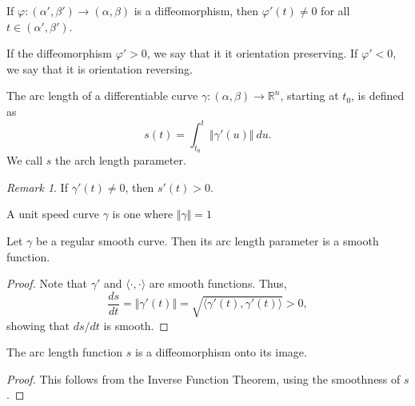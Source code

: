 \documentclass[11pt]{article}
\newcommand{\R}{\mathbb{R}}
\newcommand{\ip}[2]{\langle #1, #2 \rangle}
\newcommand{\norm}[1]{\Vert #1 \Vert}
\newcommand{\dd}[2]{\frac{d #1}{d #2}}
\theoremstyle{definition}
\theoremstyle{remark}
\newtheorem*{remark}{Remark}
\numberwithin{equation}{section}
\begin{document}
    \begin{lemma}
        If $\varphi\colon (\alpha', \beta') \to (\alpha, \beta)$ is a diffeomorphism,
        then $\varphi'(t) \neq 0$ for all $t \in (\alpha', \beta')$.
    \end{lemma}

    \begin{definition}
        If the diffeomorphism $\varphi' > 0$, we say that it it orientation
        preserving. If $\varphi' < 0$, we say that it is orientation reversing.
    \end{definition}

    \begin{definition}
        The arc length of a differentiable curve $\gamma\colon (\alpha, \beta) \to
        \R^n$, starting at $t_0$, is defined as \[
            s(t) = \int_{t_0}^t \norm{\gamma'(u)}\:du.
        \] We call $s$ the arch length parameter.

        \begin{remark}
            If $\gamma'(t) \neq 0$, then $s'(t) > 0$.
        \end{remark}
    \end{definition}

    \begin{definition}
        A unit speed curve $\gamma$ is one where $\norm{\gamma} = 1$
    \end{definition}

    \begin{lemma}
        Let $\gamma$ be a regular smooth curve. Then its arc length parameter is a
        smooth function.
    \end{lemma}
    \begin{proof}
        Note that $\gamma'$ and $\ip{\cdot}{\cdot}$ are smooth functions. Thus, \[
            \dd{s}{t} = \norm{\gamma'(t)} = \sqrt{\ip{\gamma'(t)}{\gamma'(t)}} > 0,
        \] showing that $ds / dt$ is smooth.
    \end{proof}

    \begin{lemma}
        The arc length function $s$ is a diffeomorphism onto its image.
    \end{lemma}
    \begin{proof}
        This follows from the Inverse Function Theorem, using the smoothness of $s$.
    \end{proof}
\end{document}
